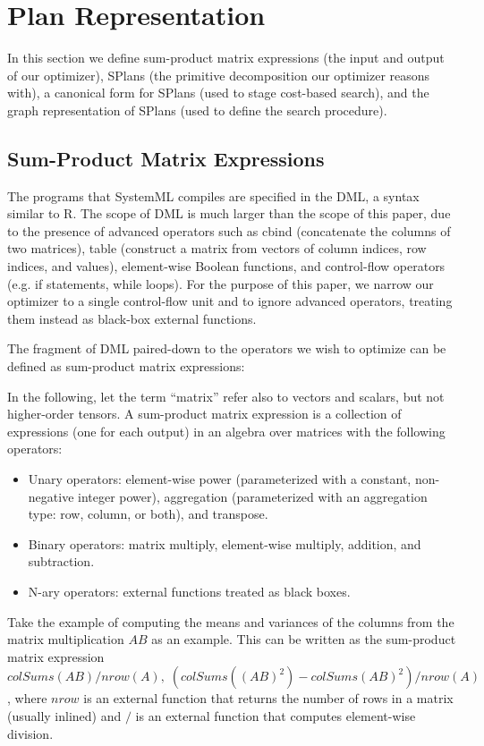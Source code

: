 \section{Plan Representation}
In this section we define sum-product matrix expressions (the input and output of our optimizer), SPlans (the primitive decomposition our optimizer reasons with), a canonical form for SPlans (used to stage cost-based search), and the graph representation of SPlans (used to define the search procedure).


\subsection{Sum-Product Matrix Expressions}
The programs that SystemML compiles are specified in the DML, a syntax similar to R.  The scope of DML is much larger than the scope of this paper, due to the presence of advanced operators such as cbind (concatenate the columns of two matrices), table (construct a matrix from vectors of column indices, row indices, and values), element-wise Boolean functions, and control-flow operators (e.g. if statements, while loops).
For the purpose of this paper, we narrow our optimizer to a single control-flow unit and to ignore advanced operators, treating them instead as black-box external functions.

The fragment of DML paired-down to the operators we wish to optimize can be defined as sum-product matrix expressions:
\begin{definition}
In the following, let the term ``matrix'' refer also to vectors and scalars, but not higher-order tensors.
A sum-product matrix expression is a collection of expressions (one for each output) in an algebra over matrices with the following operators:
\begin{itemize}
  \item Unary operators: element-wise power (parameterized with a constant, non-negative integer power), aggregation (parameterized with an aggregation type: row, column, or both), and transpose.
  \item Binary operators: matrix multiply, element-wise multiply, addition, and subtraction.
  \item N-ary operators: external functions treated as black boxes.
\end{itemize}
\end{definition}


Take the example of computing the means and variances of the columns from the matrix multiplication $AB$ as an example.
This can be written as the sum-product matrix expression $colSums(AB) / nrow(A),\; (colSums((AB)^2) - colSums(AB)^2) / nrow(A)$, where $nrow$ is an external function that returns the number of rows in a matrix (usually inlined) and $/$ is an external function that computes element-wise division.

